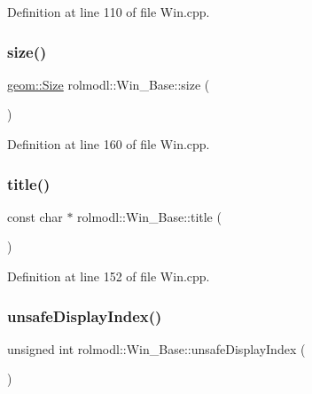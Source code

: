 Definition at line 110 of file Win.\+cpp.

\mbox{\label{classrolmodl_1_1_win___base_aa9e0fe7017cafd9a89e18d4676ff6c00}} 
\subsubsection{\texorpdfstring{size()}{size()}}
{\footnotesize\ttfamily \mbox{\hyperlink{structrolmodl_1_1geom_1_1_size}{geom\+::\+Size}} rolmodl\+::\+Win\+\_\+\+Base\+::size (\begin{DoxyParamCaption}{ }\end{DoxyParamCaption})\hspace{0.3cm}{\ttfamily [noexcept]}}



Definition at line 160 of file Win.\+cpp.

\mbox{\label{classrolmodl_1_1_win___base_abc249a06cd285e302175c0371ed2564a}} 
\subsubsection{\texorpdfstring{title()}{title()}}
{\footnotesize\ttfamily const char $\ast$ rolmodl\+::\+Win\+\_\+\+Base\+::title (\begin{DoxyParamCaption}{ }\end{DoxyParamCaption})\hspace{0.3cm}{\ttfamily [noexcept]}}



Definition at line 152 of file Win.\+cpp.

\mbox{\label{classrolmodl_1_1_win___base_ac58ea3d9b32a0ead9aad7bfc380b0619}} 
\subsubsection{\texorpdfstring{unsafeDisplayIndex()}{unsafeDisplayIndex()}}
{\footnotesize\ttfamily unsigned int rolmodl\+::\+Win\+\_\+\+Base\+::unsafe\+Display\+Index (\begin{DoxyParamCaption}{ }\end{DoxyParamCaption})}



